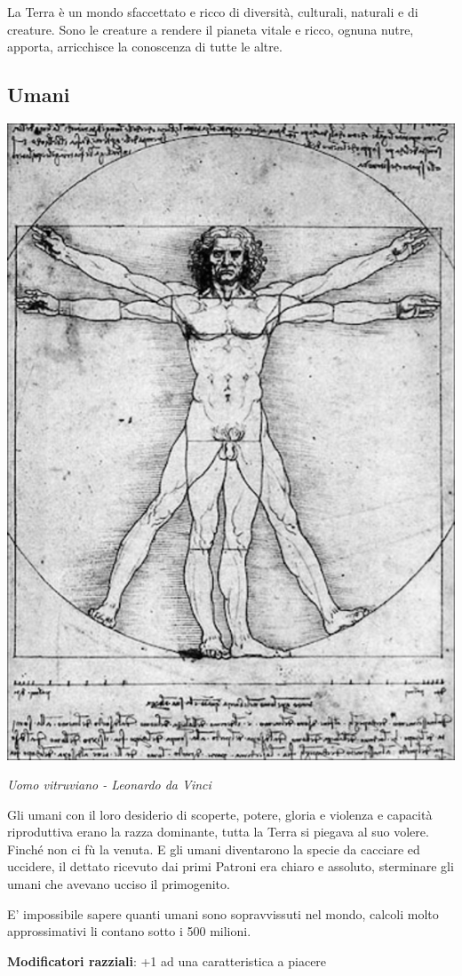 \begin{multicols}{2}

La Terra è un mondo sfaccettato e ricco di diversità, culturali, naturali e di creature.
Sono le creature a rendere il pianeta vitale e ricco, ognuna nutre, apporta, arricchisce la conoscenza di tutte le altre.


\subsection{Umani}\label{umani}


\begin{center}
\includegraphics[height=0.9\linewidth]{immagini/uomovitruviano2.png}

\emph{Uomo vitruviano - Leonardo da Vinci}
\end{center}


Gli umani con il loro desiderio di scoperte, potere, gloria e violenza e capacità riproduttiva erano la razza dominante, tutta la Terra si piegava al suo volere. Finché non ci fù la venuta.
E gli umani diventarono la specie da cacciare ed uccidere, il dettato ricevuto dai primi Patroni era chiaro e assoluto, sterminare gli umani che avevano ucciso il primogenito.

E' impossibile sapere quanti umani sono sopravvissuti nel mondo, calcoli molto approssimativi li contano sotto i 500 milioni.

\textbf{Modificatori razziali}: +1 ad una caratteristica a piacere


\end{multicols}

